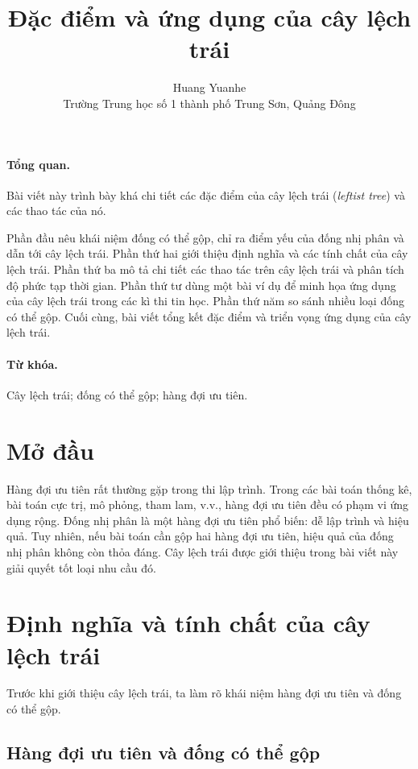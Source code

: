 \documentclass[11pt]{article}
\title{Đặc điểm và ứng dụng của cây lệch trái}
\author{Huang Yuanhe\\Trường Trung học số 1 thành phố Trung Sơn, Quảng Đông}
\date{}
\begin{document}
\maketitle


\paragraph{Tổng quan.}
Bài viết này trình bày khá chi tiết các đặc điểm của cây lệch trái
(\emph{leftist tree}) và các thao tác của nó.

Phần đầu nêu khái niệm đống có thể gộp, chỉ ra điểm yếu của đống nhị phân và
dẫn tới cây lệch trái. Phần thứ hai giới thiệu định nghĩa và các tính chất của
cây lệch trái. Phần thứ ba mô tả chi tiết các thao tác trên cây lệch trái và
phân tích độ phức tạp thời gian. Phần thứ tư dùng một bài ví dụ để minh họa
ứng dụng của cây lệch trái trong các kì thi tin học. Phần thứ năm so sánh nhiều
loại đống có thể gộp. Cuối cùng, bài viết tổng kết đặc điểm và triển vọng ứng
dụng của cây lệch trái.

\paragraph{Từ khóa.}
Cây lệch trái; đống có thể gộp; hàng đợi ưu tiên.

\section{Mở đầu}

Hàng đợi ưu tiên rất thường gặp trong thi lập trình. Trong các bài toán thống
kê, bài toán cực trị, mô phỏng, tham lam, v.v., hàng đợi ưu tiên đều có phạm vi
ứng dụng rộng. Đống nhị phân là một hàng đợi ưu tiên phổ biến: dễ lập trình và
hiệu quả. Tuy nhiên, nếu bài toán cần gộp hai hàng đợi ưu tiên, hiệu quả của
đống nhị phân không còn thỏa đáng. Cây lệch trái được giới thiệu trong bài viết
này giải quyết tốt loại nhu cầu đó.

\section{Định nghĩa và tính chất của cây lệch trái}

Trước khi giới thiệu cây lệch trái, ta làm rõ khái niệm hàng đợi ưu tiên và
đống có thể gộp.

\subsection{Hàng đợi ưu tiên và đống có thể gộp}
\end{document}
